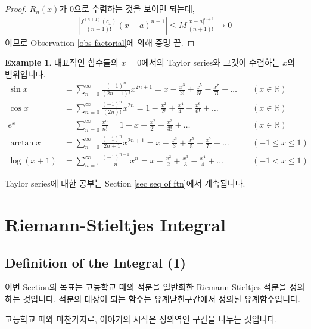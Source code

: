 \documentclass[12pt]{article}
\theoremstyle{definition}
\newtheorem*{ex}{Example}
\def\RR{\mathbb{R}}
\newcommand{\abs}[1]{\left\vert#1\right\vert}
\begin{document}
\begin{proof}
	\(R_n(x)\)가 0으로 수렴하는 것을 보이면 되는데,
	\begin{gather*}
		\abs{\frac{f^{(n+1)}(c_x)}{(n+1)!} (x-a)^{n+1}} \le M\frac{\abs{x-a}^{n+1}}{(n+1)!} \longrightarrow 0
	\end{gather*}
	이므로 Observation \ref{obs factorial}에 의해 증명 끝.
\end{proof}

\begin{ex}
	대표적인 함수들의 \(x=0\)에서의 Taylor series와 그것이 수렴하는 \(x\)의 범위입니다.
	\begin{align*}
		\sin x &= \sum_{n=0}^\infty \frac{(-1)^n}{(2n+1)!} x^{2n+1} = x - \frac{x^3}{3!} + \frac{x^5}{5!} - \frac{x^7}{7!} + \ldots \quad &(x \in \RR)\\
		\cos x &= \sum_{n=0}^\infty \frac{(-1)^n}{(2n)!} x^{2n} = 1 - \frac{x^2}{2!} + \frac{x^4}{4!} - \frac{x^6}{6!} + \ldots \quad &(x \in \RR)\\
		e^x &= \sum_{n=0}^\infty \frac{x^n}{n!} = 1 + x + \frac{x^2}{2!} + \frac{x^3}{3!} + \ldots \quad &(x \in \RR)\\
		\arctan x &= \sum_{n=0}^\infty \frac{(-1)^n}{2n+1} x^{2n+1} = x - \frac{x^3}{3} + \frac{x^5}{5} - \frac{x^7}{7!} + \ldots \quad &(-1 \le x \le 1)\\
		\log (x+1) &= \sum_{n=1}^\infty \frac{(-1)^{n-1}}{n} x^n = x - \frac{x^2}{2} + \frac{x^3}{3} - \frac{x^4}{4} + \ldots \quad &(-1 < x \le 1)
	\end{align*}
\end{ex}

Taylor series에 대한 공부는 Section \ref{sec seq of ftn}에서 계속됩니다.

\newpage


\section{Riemann-Stieltjes Integral}
\subsection{Definition of the Integral (1)} \label{sec def int}

이번 Section의 목표는 고등학교 때의 적분을 일반화한 Riemann-Stieltjes 적분을 정의하는 것입니다. 적분의 대상이 되는 함수는 유계닫힌구간에서 정의된 유계함수입니다.

고등학교 때와 마찬가지로, 이야기의 시작은 정의역인 구간을 나누는 것입니다.
\end{document}
